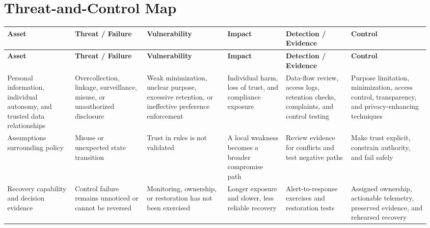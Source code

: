 \documentclass[11pt]{article}
\begin{document}
\section*{Threat-and-Control Map}
\begingroup\scriptsize\setlength{\tabcolsep}{2pt}
\begin{longtable}{>{\RaggedRight\arraybackslash}p{}>{\RaggedRight\arraybackslash}p{}>{\RaggedRight\arraybackslash}p{}>{\RaggedRight\arraybackslash}p{}>{\RaggedRight\arraybackslash}p{}>{\RaggedRight\arraybackslash}p{}}
\toprule\rowcolor{Navy}\color{white}\textbf{Asset} & \color{white}\textbf{Threat / Failure} & \color{white}\textbf{Vulnerability} & \color{white}\textbf{Impact} & \color{white}\textbf{Detection / Evidence} & \color{white}\textbf{Control}\\\midrule
\endfirsthead
\toprule\rowcolor{Navy}\color{white}\textbf{Asset} & \color{white}\textbf{Threat / Failure} & \color{white}\textbf{Vulnerability} & \color{white}\textbf{Impact} & \color{white}\textbf{Detection / Evidence} & \color{white}\textbf{Control}\\\midrule
\endhead
Personal information, individual autonomy, and trusted data relationships & Overcollection, linkage, surveillance, misuse, or unauthorized disclosure & Weak minimization, unclear purpose, excessive retention, or ineffective preference enforcement & Individual harm, loss of trust, and compliance exposure & Data-flow review, access logs, retention checks, complaints, and control testing & Purpose limitation, minimization, access control, transparency, and privacy-enhancing techniques\\\midrule
Assumptions surrounding policy & Misuse or unexpected state transition & Trust in rules is not validated & A local weakness becomes a broader compromise path & Review evidence for conflicts and test negative paths & Make trust explicit, constrain authority, and fail safely\\\midrule
Recovery capability and decision evidence & Control failure remains unnoticed or cannot be reversed & Monitoring, ownership, or restoration has not been exercised & Longer exposure and slower, less reliable recovery & Alert-to-response exercises and restoration tests & Assigned ownership, actionable telemetry, preserved evidence, and rehearsed recovery\\\midrule
\bottomrule
\end{longtable}
\endgroup
\end{document}
